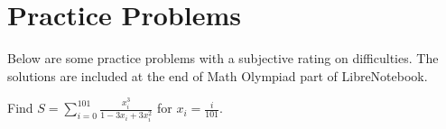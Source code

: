 \documentclass[../../main.tex]{subfiles}
\begin{document}
\section{Practice Problems}

Below are some practice problems with a subjective rating on
difficulties. The solutions are included at the end of Math Olympiad
part of LibreNotebook.

\begin{listproblem}
Find $S = \sum_{i=0}^{101} \frac{x_i^3}{1 - 3x_i + 3x_i^2}$ for
$x_i = \frac{i}{101}$.
\end{listproblem}
\end{document}

